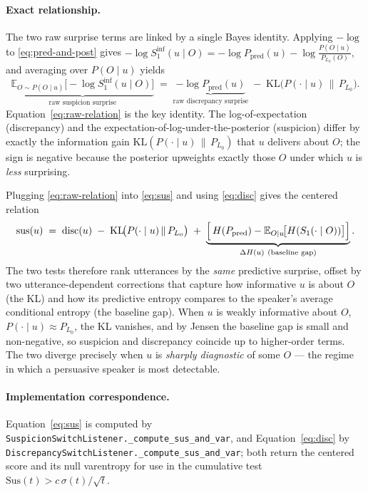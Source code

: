 \paragraph{Exact relationship.}
The two raw surprise terms are linked by a single Bayes identity.
Applying $-\log$ to \eqref{eq:pred-and-post} gives
\(
  -\log S_1^{\mathrm{inf}}(u\mid O) = -\log P_{\mathrm{pred}}(u) - \log\frac{P(O\mid u)}{P_{L_0}(O)},
\)
and averaging over $P(O\mid u)$ yields
\begin{equation}
  \underbrace{\mathbb{E}_{O\sim P(O\mid u)}\!\bigl[-\log S_1^{\mathrm{inf}}(u\mid O)\bigr]}_{\text{raw suspicion surprise}}
  \;=\;
  \underbrace{-\log P_{\mathrm{pred}}(u)}_{\text{raw discrepancy surprise}}
  \;-\;
  \mathrm{KL}\!\bigl(P(\cdot\mid u)\,\|\,P_{L_0}\bigr).
  \label{eq:raw-relation}
\end{equation}
Equation~\eqref{eq:raw-relation} is the key identity.  The log-of-expectation
(discrepancy) and the expectation-of-log-under-the-posterior (suspicion)
differ by exactly the information gain
$\mathrm{KL}(P(\cdot\mid u)\,\|\,P_{L_0})$ that $u$ delivers about $O$; the
sign is negative because the posterior upweights exactly those $O$ under
which $u$ is \emph{less} surprising.

Plugging \eqref{eq:raw-relation} into \eqref{eq:sus} and using
\eqref{eq:disc} gives the centered relation
\begin{equation}
  \mathrm{sus}(u) \;=\; \mathrm{disc}(u)
  \;-\; \mathrm{KL}\!\bigl(P(\cdot\mid u)\,\|\,P_{L_0}\bigr)
  \;+\; \underbrace{\Bigl[\,H(P_{\mathrm{pred}}) - \mathbb{E}_{O\mid u}\!\bigl[H(S_1(\cdot\mid O))\bigr]\Bigr]}_{\Delta H(u)\ \text{(baseline gap)}}.
  \label{eq:centered-relation}
\end{equation}
The two tests therefore rank utterances by the \emph{same} predictive
surprise, offset by two utterance-dependent corrections that capture
how informative $u$ is about $O$ (the KL) and how its predictive entropy
compares to the speaker's average conditional entropy (the baseline gap).
When $u$ is weakly informative about $O$, $P(\cdot\mid u)\approx P_{L_0}$,
the KL vanishes, and by Jensen the baseline gap is small and non-negative,
so suspicion and discrepancy coincide up to higher-order terms.  The two
diverge precisely when $u$ is \emph{sharply diagnostic} of some $O$ — the
regime in which a persuasive speaker is most detectable.

\paragraph{Implementation correspondence.}
Equation~\eqref{eq:sus} is computed by
\texttt{SuspicionSwitchListener.\_compute\_sus\_and\_var}, and
Equation~\eqref{eq:disc} by
\texttt{DiscrepancySwitchListener.\_compute\_sus\_and\_var}; both return the
centered score and its null varentropy for use in the cumulative test
$\mathrm{Sus}(t) > c\,\sigma(t)/\sqrt{t}$.
